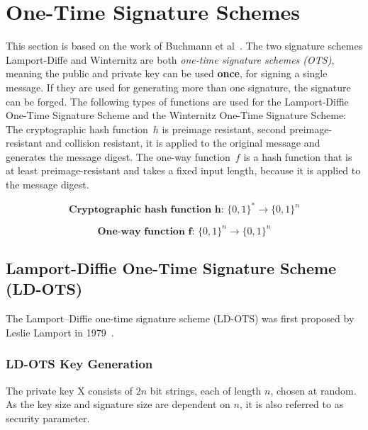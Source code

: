 \section{One-Time Signature Schemes}
\label{sec:one-time_sign_schemes}
This section is based on the work of Buchmann et al~\cite{book_pqc_bernstein_2004}. 
The two signature schemes Lamport-Diffe and Winternitz are both \textit{one-time signature schemes (OTS)}, meaning the public and private key can be used \textbf{once}, for signing a single message. If they are used for generating more than one signature, the signature can be forged. %
The following types of functions are used for the Lamport-Diffie One-Time Signature Scheme and the Winternitz One-Time Signature Scheme: 
The cryptographic hash function~$h$ is preimage resistant, second preimage-resistant and collision resistant, it is applied to the original message and generates the message digest.
The one-way function~$f$ is a hash function that is at least preimage-resistant and takes a fixed input length, because it is applied to the message digest.%

\begin{equation}
\label{eq:basic_hashfunc}
\textbf{Cryptographic hash function h: } \lbrace 0,1 \rbrace^* \rightarrow \lbrace 0,1 \rbrace^n
\end{equation}

\begin{equation}
\label{eq:one-way-func}
\textbf{One-way function f: } \lbrace 0,1 \rbrace^n \rightarrow \lbrace 0,1 \rbrace ^n
\end{equation}


\subsection{Lamport-Diffie One-Time Signature Scheme (LD-OTS)}
The Lamport–Diffie one-time signature scheme (LD-OTS) was first proposed by Leslie Lamport in 1979~\cite{lamport_signature_scheme_1979}. 

\subsubsection{LD-OTS Key Generation}
The private key X consists of $2n$ bit strings, each of length $n$, chosen at random. As the key size and signature size are dependent on $n$, it is also referred to as security parameter.

